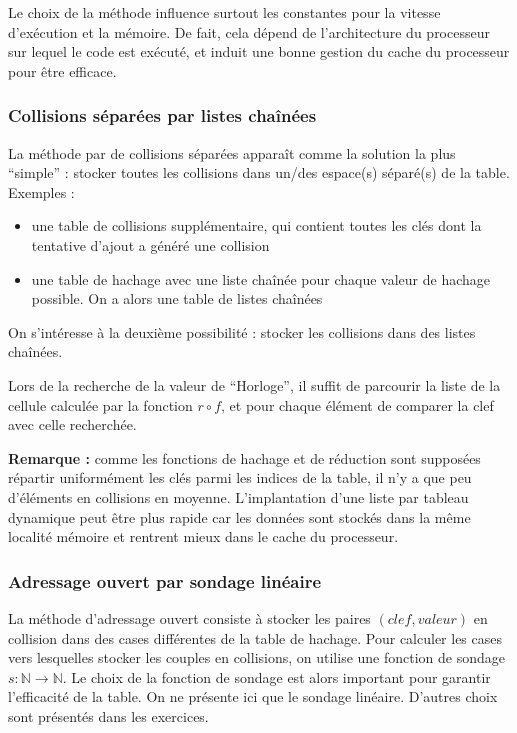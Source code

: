 \documentclass[../../../main.tex]{subfiles}
\begin{document}
Le choix de la méthode influence surtout les constantes pour la vitesse d'exécution et la mémoire. De fait, cela dépend de l'architecture du processeur sur lequel le code est exécuté, et induit une bonne gestion du cache du processeur pour être efficace.
\subsubsection{Collisions séparées par listes chaînées}
La méthode par de collisions séparées apparaît comme la solution la plus ``simple'' : stocker toutes les collisions dans un/des espace(s) séparé(s) de la table. Exemples :
\begin{itemize}
	\item une table de collisions supplémentaire, qui contient toutes les clés dont la tentative d'ajout a généré une collision
	\item une table de hachage avec une liste chaînée pour chaque valeur de hachage possible. On a alors une table de listes chaînées
\end{itemize}
On s'intéresse à la deuxième possibilité : stocker les collisions dans des listes chaînées.

\begin{minipage}{\textwidth}
	\begin{center}
		
	\end{center}
\end{minipage}

Lors de la recherche de la valeur de ``Horloge'', il suffit de parcourir la liste de la cellule calculée par la fonction $r\circ f$, et pour chaque élément de comparer la clef avec celle recherchée.

\textbf{Remarque :} comme les fonctions de hachage et de réduction sont supposées répartir uniformément les clés parmi les indices de la table, il n'y a que peu d'éléments en collisions en moyenne. L'implantation d'une liste par tableau dynamique peut être plus rapide car les données sont stockés dans la même localité mémoire et rentrent mieux dans le cache du processeur.
\subsubsection{Adressage ouvert par sondage linéaire}
La méthode d'adressage ouvert consiste à stocker les paires $(clef, valeur)$ en collision dans des cases différentes de la table de hachage. Pour calculer les cases vers lesquelles stocker les couples en collisions, on utilise une fonction de sondage $s:\mathbb{N}\rightarrow \mathbb{N}$. Le choix de la fonction de sondage est alors important pour garantir l'efficacité de la table. On ne présente ici que le sondage linéaire. D'autres choix sont présentés dans les exercices.
\end{document}

